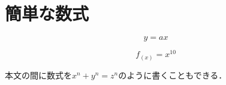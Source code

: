 \section{簡単な数式}
\begin{equation}
y = ax
\end{equation}

\begin{equation}
f_{(x)} = x^{10}
\end{equation}

本文の間に数式を$x^n+y^n=z^n$のように書くこともできる．